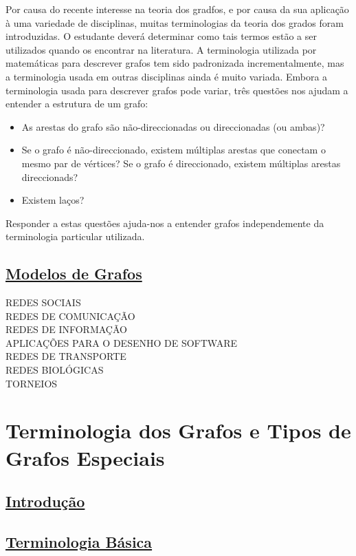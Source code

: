 Por causa do recente interesse na teoria dos gradfos, e por causa da sua
aplicação à uma variedade de disciplinas, muitas terminologias da teoria dos
grados foram introduzidas. O estudante deverá determinar como tais termos estão
a ser utilizados quando os encontrar na literatura. A terminologia utilizada por
matemáticas para descrever grafos tem sido padronizada incrementalmente, mas a
terminologia usada em outras disciplinas ainda é muito variada. Embora a
terminologia usada para descrever grafos pode variar, três questões nos ajudam a
entender a estrutura de um grafo:
\begin{itemize}
  \item As arestas do grafo são não-direccionadas ou direccionadas (ou ambas)?
  \item Se o grafo é não-direccionado, existem múltiplas arestas que conectam o
  mesmo par de vértices? Se o grafo é direccionado, existem múltiplas arestas
  direccionads?
  \item Existem laços?
\end{itemize}

Responder a estas questões ajuda-nos a entender grafos independemente da
terminologia particular utilizada.


\subsection*{\underline{Modelos de Grafos}}

\begin{description}
\item[REDES SOCIAIS]
\item[REDES DE COMUNICAÇÃO]
\item[REDES DE INFORMAÇÃO]
\item[APLICAÇÕES PARA O DESENHO DE SOFTWARE]
\item[REDES DE TRANSPORTE]
\item[REDES BIOLÓGICAS]
\item[TORNEIOS]
\end{description}

\section{Terminologia dos Grafos e Tipos de Grafos Especiais}
\subsection*{\underline{Introdução}}
\subsection*{\underline{Terminologia Básica}}
